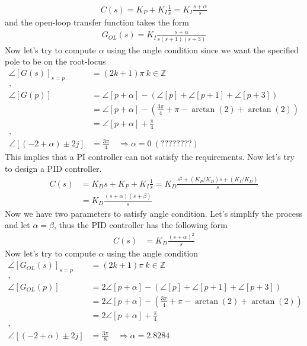 \documentclass[twoside]{article}
\begin{document}
%
\begin{align*}
 C(s) = K_P + K_I \frac{1}{s} = K_I \frac{s + \alpha}{s}
\end{align*}
% 
and the open-loop transfer function takes the form
%
\begin{align*}
  G_{OL}(s) = K_I \frac{s + \alpha}{s (s+1) (s+3)}
\end{align*}
%
Now let's try to compute $\alpha$ using the angle condition
since we want the specified pole to be on the root-locus
%
\begin{align*}
  \angle [ G(s) ]_{s=p} &= (2 k + 1) \pi \ k \in \mathbb{Z}
\\
,
\\
  \angle [ G(p) ] &= \angle [ p + \alpha ] - \left( \angle [ p ] +
  \angle [ p + 1 ] + \angle [ p +  3] \right) 
\\
&= \angle [ p + \alpha ]  - \left( \frac{3 \pi}{4} + \pi - \arctan(2)
  + \arctan(2) \right) 
\\
&= \angle [ p + \alpha ]  + \frac{\pi}{4} 
\\
,
\\
\angle [ (-2 + \alpha) \pm 2 j ] &= \frac{3 \pi}{4} \quad \Rightarrow
                                   \alpha = 0 \ (????????)
\end{align*}
% 
This implies that a PI controller can not satisfy the requirements.
Now let's try to design a PID controller. 
%
\begin{align*}
 C(s) &= K_D s + K_P + K_I \frac{1}{s} 
= K_D  \frac{ s^2 +   (K_P/K_D) s  + (K_I/K_D)  }{s}
\\
&= K_D \frac{ (s+\alpha) (s + \beta) }{s}
\end{align*}
%
Now we have two parameters to satisfy angle condition. Let's simplify
the process and let $\alpha = \beta$, thus the PID controller has the
following form
%
\begin{align*}
 C(s) 
&= K_D \frac{(s+\alpha)^2}{s}
\end{align*}
%
Now let's try to compute $\alpha$ using the angle condition
%
\begin{align*}
  \angle [ G_{OL}(s) ]_{s=p} &= (2 k + 1) \pi \ k \in \mathbb{Z}
\\
,
\\
  \angle [ G_{OL}(p) ] &= 2 \angle [ p + \alpha ] - \left( \angle [ p ] +
  \angle [ p + 1 ] + \angle [ p +  3] \right) 
\\
&= 2 \angle [ p + \alpha ]  - \left( \frac{3 \pi}{4} + \pi - \arctan(2)
  + \arctan(2) \right) 
\\
&= 2 \angle [ p + \alpha ]  + \frac{\pi}{4} 
\\
,
\\
\angle [ (-2 + \alpha) \pm 2 j ] &= \frac{3 \pi}{8} \quad \Rightarrow
                                   \alpha = 2.8284 
\end{align*}
\end{document}
